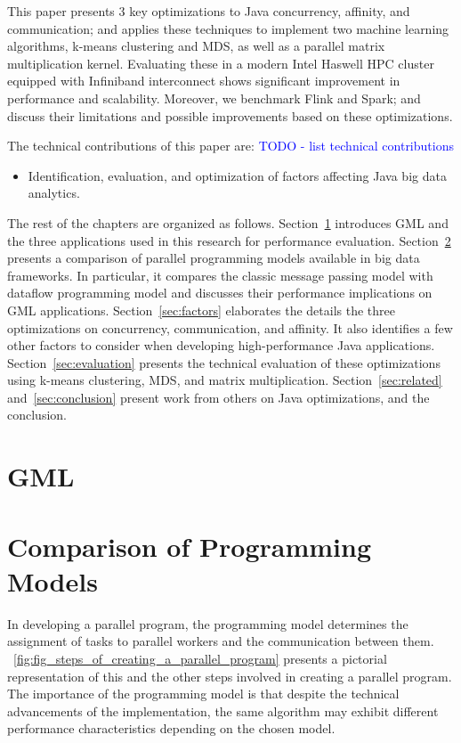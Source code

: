 \documentclass[10pt, conference, compsocconf]{IEEEtran}
\begin{document}
This paper presents 3 key optimizations to Java concurrency, affinity, and communication; and applies these techniques to implement two machine learning algorithms, k-means clustering and \ac{MDS}, as well as a parallel matrix multiplication kernel. Evaluating these in a modern Intel Haswell \ac{HPC} cluster equipped with Infiniband interconnect shows significant improvement in performance and scalability. Moreover, we benchmark Flink and Spark; and discuss their limitations and possible improvements based on these optimizations. 

The technical contributions of this paper are:
\textcolor{blue}{TODO - list technical contributions}
\begin{itemize}
\item Identification, evaluation, and optimization of factors affecting Java big data analytics. 
\end{itemize}

The rest of the chapters are organized as follows. Section~\ref{sec:apps} introduces \ac{GML} and the three applications used in this research for performance evaluation. Section~\ref{sec:models} presents a comparison of parallel programming models available in big data frameworks. In particular, it compares the classic  message passing model with dataflow programming model and discusses their performance implications on \ac{GML} applications. Section~\ref{sec:factors} elaborates the details the three optimizations on concurrency, communication, and affinity. It also identifies a few other factors to consider when developing high-performance Java applications. Section~\ref{sec:evaluation} presents the technical evaluation of these optimizations using k-means clustering, \ac{MDS}, and matrix multiplication. Section~\ref{sec:related} and~\ref{sec:conclusion} present work from others on Java optimizations, and the conclusion.

\section{\acl{GML}} \label{sec:apps}

\section{Comparison of Programming Models} \label{sec:models}
In developing a parallel program, the programming model determines the assignment of tasks to parallel workers and the communication between them. \figurename~\ref{fig:fig_steps_of_creating_a_parallel_program} presents a pictorial representation of this and the other steps involved in creating a parallel program.
The importance of the programming model is that despite the technical advancements of the implementation, the same algorithm may exhibit different performance characteristics depending on the chosen model. 
\end{document}
